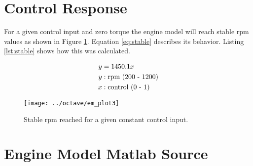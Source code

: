 \documentclass{article}
\begin{document}



\clearpage
\section{Control Response}
\label{app:contrpm}

For a given control input and zero torque the engine model will
reach stable rpm values as shown in Figure \ref{fig:stable}.
Equation \ref{eq:stable} describes its behavior.
Listing \ref{lst:stable} shows how this was calculated.

\begin{align}
y &= 1450.1 x \label{eq:stable} \\
	y &: \text{rpm (200 - 1200)} \notag \\
	x &: \text{control (0 - 1)} \notag
\end{align}

\begin{figure}[htbp!]
\begin{center}
\texttt{[image: ../octave/em\_plot3]}
\end{center}
\caption{Stable rpm reached for a given constant control input.}
\label{fig:stable}
\end{figure}

\clearpage


\clearpage
\section{Engine Model Matlab Source}
\label{app:em_matlab}





\clearpage

\end{document}

